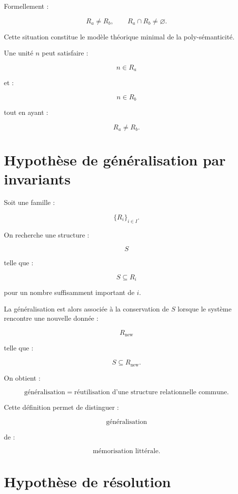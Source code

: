 \documentclass[11pt,a4paper]{article}
\begin{document}
Formellement :

\[
R_a\neq R_b,
\qquad
R_a\cap R_b\neq\varnothing.
\]

Cette situation constitue le modèle théorique minimal de la poly-sémanticité.

Une unité $n$ peut satisfaire :

\[
n\in R_a
\]

et :

\[
n\in R_b
\]

tout en ayant :

\[
R_a\neq R_b.
\]

\section{Hypothèse de généralisation par invariants}

Soit une famille :

\[
\{R_i\}_{i\in I}.
\]

On recherche une structure :

\[
S
\]

telle que :

\[
S\subseteq R_i
\]

pour un nombre suffisamment important de $i$.

La généralisation est alors associée à la conservation de $S$ lorsque le
système rencontre une nouvelle donnée :

\[
R_{\mathrm{new}}
\]

telle que :

\[
S\subseteq R_{\mathrm{new}}.
\]

On obtient :

\[
\boxed{
\text{généralisation}
=
\text{réutilisation d'une structure relationnelle commune}.
}
\]

Cette définition permet de distinguer :

\[
\text{généralisation}
\]

de :

\[
\text{mémorisation littérale}.
\]

\section{Hypothèse de résolution}
\end{document}
